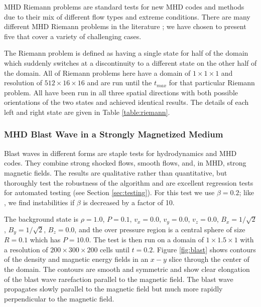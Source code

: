 MHD Riemann problems are standard tests for new MHD codes and methods due to their mix of different flow types and extreme conditions. There are many different MHD Riemann problems in the literature \citep{brio_wu_1988, einfeldt_1991, ryu_jones_1995, dai_woodward_1998}; we have chosen to present five that cover a variety of challenging cases. 

The Riemann problem is defined as having a single state for half of the domain which suddenly switches at a discontinuity to a different state on the other half of the domain. All of Riemann problems here have a domain of $1\times1\times1$ and resolution of $512\times16\times16$ and are run until the $t_{max}$ for that particular Riemann problem. All have been run in all three spatial directions with both possible orientations of the two states and achieved identical results. The details of each left and right state are given in Table \ref{table:riemann}.





\subsubsection{MHD Blast Wave in a Strongly Magnetized Medium}
\label{sec:mhd-blast}

Blast waves in different forms are staple tests for hydrodynamics and MHD codes. They combine strong shocked flows, smooth flows, and, in MHD, strong magnetic fields. The results are qualitative rather than quantitative, but thoroughly test the robustness of the algorithm and are excellent regression tests for automated testing (see Section \ref{sec:testing}). For this test we use $\beta = 0.2$; like \cite{stone_2009}, we find instabilities if $\beta$ is decreased by a factor of 10. 

The background state is
$\rho = 1.0$,
$P = 0.1$,
$v_x = 0.0$,
$v_y = 0.0$,
$v_z = 0.0$,
$B_x = 1/\sqrt{2}$,
$B_y = 1/\sqrt{2}$,
$B_z = 0.0$,
and the over pressure region is a central sphere of size $R = 0.1$ which has $P=10.0$. The test is then run on a domain of $1\times1.5\times1$ with a resolution of $200\times300\times200$ cells until $t = 0.2$. Figure \ref{fig:blast} shows contours of the density and magnetic energy fields in an $x-y$ slice through the center of the domain. The contours are smooth and symmetric and show clear elongation of the blast wave rarefaction parallel to the magnetic field. The blast wave propagates slowly parallel to the magnetic field but much more rapidly perpendicular to the magnetic field.

